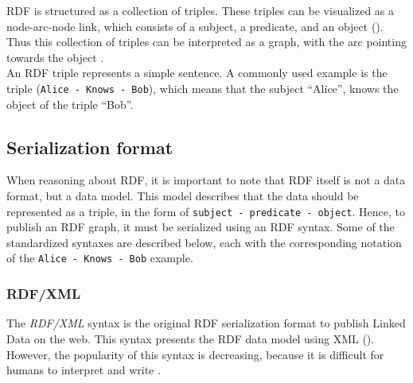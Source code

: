\noindent RDF is structured as a collection of triples. These triples can be visualized as a node-arc-node link, which consists of a subject, a predicate, and an object (). Thus this collection of triples can be interpreted as a graph, with the arc pointing towards the object \cite{klyne2009resource}.\\

\noindent An RDF triple represents a simple sentence. A commonly used example is the triple (\texttt{Alice - Knows - Bob}), which means that the subject ``Alice'', knows the object of the triple ``Bob''.

\subsection{Serialization format}
When reasoning about RDF, it is important to note that RDF itself is not a data format, but a data model. This model describes that the data should be represented as a triple, in the form of \texttt{subject - predicate - object}. Hence, to publish an RDF graph, it must be serialized using an RDF syntax\cite{heath2011linked}. Some of the standardized syntaxes are described below, each with the corresponding notation of the \texttt{Alice - Knows - Bob} example.

\subsubsection{RDF/XML}
The \emph{RDF/XML} syntax is the original RDF serialization format to publish Linked Data on the web. This syntax presents the RDF data model using XML (). However, the popularity of this syntax is decreasing, because it is difficult for humans to interpret and write \cite{manola2004rdf}.



\newpage

